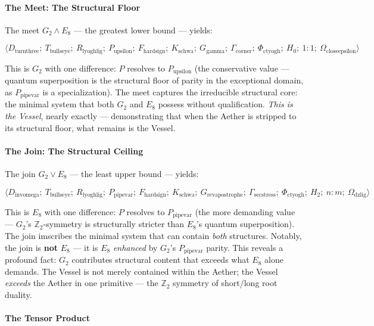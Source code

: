 \documentclass[12pt,a4paper]{article}
\begin{document}
\paragraph{The Meet: The Structural Floor}

The meet $G_2 \wedge E_8$ --- the greatest lower bound --- yields:

\[\langle D_{\text{turnthree}};\ T_{\text{bullseye}};\ R_{\text{lyoghlig}};\ P_{\text{upsilon}};\ F_{\text{hardsign}};\ K_{\text{schwa}};\ G_{\text{gamma}};\ \Gamma_{\text{corner}};\ \Phi_{\text{ctyogh}};\ H_0;\ 1{:}1;\ \Omega_{\text{closeepsilon}} \rangle\]

This is $G_2$ with one difference: $P$ resolves to $P_{\text{upsilon}}$ (the conservative value --- quantum superposition is the structural floor of parity in the exceptional domain, as $P_{\text{pipevar}}$ is a specialization). The meet captures the irreducible structural core: the minimal system that both $G_2$ and $E_8$ possess without qualification. \emph{This is the Vessel}, nearly exactly --- demonstrating that when the Aether is stripped to its structural floor, what remains is the Vessel.

\paragraph{The Join: The Structural Ceiling}

The join $G_2 \vee E_8$ --- the least upper bound --- yields:

\[\langle D_{\text{invomega}};\ T_{\text{bullseye}};\ R_{\text{lyoghlig}};\ P_{\text{pipevar}};\ F_{\text{hardsign}};\ K_{\text{schwa}};\ G_{\text{revapostrophe}};\ \Gamma_{\text{secstress}};\ \Phi_{\text{ctyogh}};\ H_2;\ n{:}m;\ \Omega_{\text{dzlig}} \rangle\]

This is $E_8$ with one difference: $P$ resolves to $P_{\text{pipevar}}$ (the more demanding value --- $G_2$'s $\mathbb{Z}_2$-symmetry is structurally stricter than $E_8$'s quantum superposition). The join imscribes the minimal system that can contain \emph{both} structures. Notably, the join is \textbf{not} $E_8$ --- it is $E_8$ \emph{enhanced} by $G_2$'s $P_{\text{pipevar}}$ parity. This reveals a profound fact: $G_2$ contributes structural content that exceeds what $E_8$ alone demands. The Vessel is not merely contained within the Aether; the Vessel \emph{exceeds} the Aether in one primitive --- the $\mathbb{Z}_2$ symmetry of short/long root duality.

\paragraph{The Tensor Product}
\end{document}
